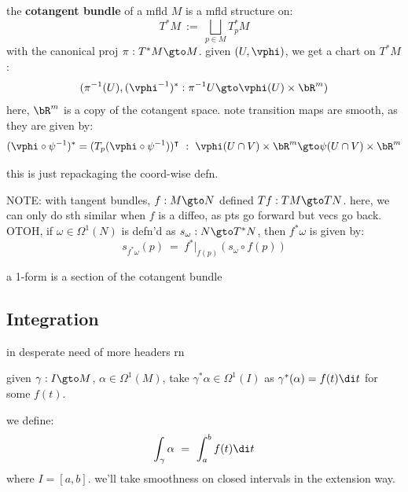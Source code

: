 \begin{defn}
	the \textbf{cotangent bundle} of a mfld $M$ is a mfld structure on:
	\begin{equation*}
		T^{*}M \ := \ \bigsqcup_{p\in M}T_{p}^{*}M
	\end{equation*}
	with the canonical proj $\pi:T^{*}M\gto M$.
	given $(U,\vphi)$, we get a chart on $T^{*}M$:
	\begin{equation*}
		(\pi^{-1}(U),(\vphi^{-1})^{*}:\pi^{-1}U\gto\vphi(U)\times\bR^{m})
	\end{equation*}
	here, $\bR^{m}$ is a copy of the cotangent space.
	note transition maps are smooth, as they are given by:
	\begin{equation*}
		(\vphi\circ\psi^{-1})^{*} = (T_{p}(\vphi\circ\psi^{-1}))^{\intercal} \ : \ \vphi(U\cap V)\times\bR^{m}\gto\psi(U\cap V)\times\bR^{m}
	\end{equation*}
\end{defn}
this is just repackaging the coord-wise defn.

NOTE: with tangent bundles, $f:M\gto N$ defined $Tf:TM\gto TN$.
here, we can only do sth similar when $f$ is a diffeo, as pts go forward but
vecs go back.
OTOH, if $\omega\in\Omega^{1}(N)$ is defn'd as $s_{\omega}:N\gto T^{*}N$, then
$f^{*}\omega$ is given by:
\begin{equation*}
	s_{f^{*}\omega}(p) \ = \ f^{*}\big\rvert_{f(p)}(s_{\omega}\circ f(p))
\end{equation*}

\begin{defn}[title=Abstract]
	a 1-form is a section of the cotangent bundle
\end{defn}

\subsection{Integration}
in desperate need of more headers rn

given $\gamma:I\gto M$, $\alpha\in\Omega^{1}(M)$, take $\gamma^{*}\alpha\in\Omega^{1}(I)$ as
$\gamma^{*}(\alpha)=f(t)\di t$ for some $f(t)$.

\begin{defn}
	we define:
	\begin{equation*}
		\int_{\gamma}\alpha \ = \ \int_{a}^{b}f(t)\di t
	\end{equation*}
	where $I=[a,b]$.
	we'll take smoothness on closed intervals in the extension way.
\end{defn} \


